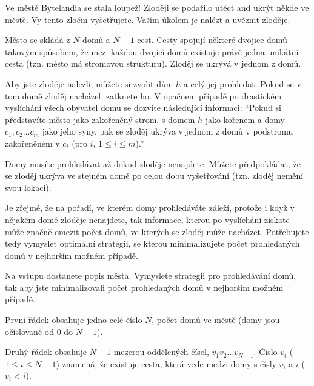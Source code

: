 





Ve městě Bytelandia se stala loupež!
Zloději se podařilo utéct and ukrýt někde ve městě.
Vy tento zločin vyšetřujete. Vaším ůkolem je nalézt a uvěznit zloděje.

Město se skládá z $N$ domů a $N-1$ cest. Cesty spojují některé dvojice domů
takovým spůsobem, že mezi každou dvojicí domů existuje právě jedna unikátní cesta
(tzn. město má stromovou strukturu).
Zloděj se ukrývá v jednom z domů.

Aby jste zloděje nalezli, můžete si zvolit dům $h$ a celý jej prohledat.
Pokud se v tom domě zloděj nacházel, zatknete ho.
V opačnem případě po drastickém vyslíchání všech obyvatel domu se dozvíte následující informaci:
``Pokud si představíte město jako zakořeněný strom, s domem $h$ jako kořenem a domy $c_1, c_2 \ldots c_m$ jako jeho syny,
pak se zloděj ukrýva v jednom z domů v podstromu zakořeněném v $c_i$ (pro $i$, $1 \leq i \leq m$).''

Domy musíte prohledávat až dokud zloděje nenajdete.
Můžete předpokládat, že se zloděj ukrýva ve stejném domě po celou dobu vyšetřování (tzn. zloděj nemění svou lokaci).

Je zřejmé, že na pořadí, ve kterém domy prohledáváte záleží, protože i když v nějakém
domě zloděje nenajdete, tak informace, kterou po vyslíchání získate může značně
omezit počet domů, ve kterých se zloděj může nacházet.
Potřebujete tedy vymyslet optimální strategii, se kterou minimalizujete počet
prohledaných domů v nejhorším možném případě.


Na vstupu dostanete popis města.
Vymyslete strategii pro prohledávání domů, tak aby jste minimalizovali
počet prohledaných domů v nejhorším možném případě.


První řádek obsahuje jedno celé číslo $N$, počet domů ve městě (domy jsou očíslované od $0$ do $N-1$).

Druhý řádek obsahuje $N-1$ mezerou oddělených čísel, $v_1 v_2 \ldots v_{N-1}$.
Číslo $v_i$ ($1 \leq i \leq N-1$) znamená, že existuje cesta, která vede medzi domy s čísly $v_i$ a $i$ ($v_i < i$).


